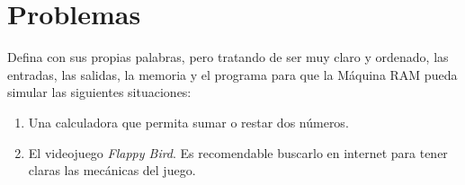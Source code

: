 \section{Problemas}
\begin{Exercise}[title={Acercamiento inicial}]	
	
Defina con sus propias palabras, pero tratando de ser muy claro y ordenado, las entradas, las salidas, la memoria y el programa para que la Máquina RAM pueda simular las siguientes situaciones:

	\begin{enumerate}
		\item Una calculadora que permita sumar o restar dos números.
		
		\item El videojuego \emph{Flappy Bird}. Es recomendable buscarlo en internet para tener claras las mecánicas del juego.
	\end{enumerate}
\end{Exercise}
